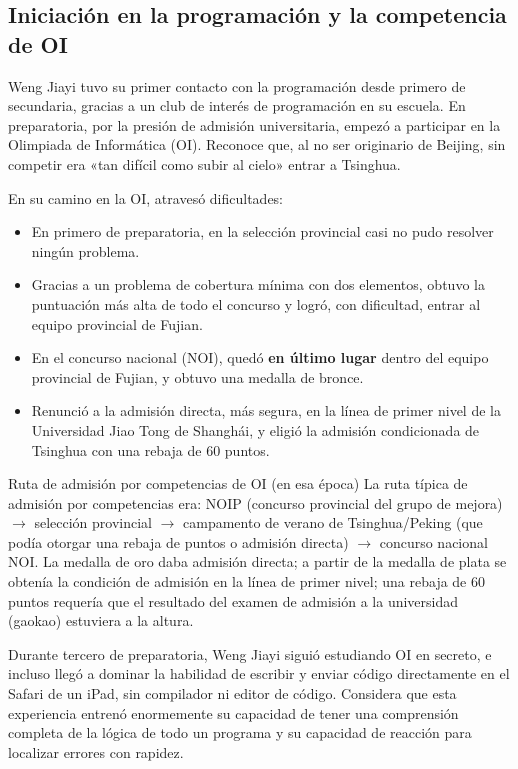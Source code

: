 \subsection{Iniciación en la programación y la competencia de OI}

Weng Jiayi tuvo su primer contacto con la programación desde primero de secundaria, gracias a un club de interés de programación en su escuela. En preparatoria, por la presión de admisión universitaria, empezó a participar en la Olimpiada de Informática (OI). Reconoce que, al no ser originario de Beijing, sin competir era «tan difícil como subir al cielo» entrar a Tsinghua.

En su camino en la OI, atravesó dificultades:
\begin{itemize}
    \item En primero de preparatoria, en la selección provincial casi no pudo resolver ningún problema.
    \item Gracias a un problema de cobertura mínima con dos elementos, obtuvo la puntuación más alta de todo el concurso y logró, con dificultad, entrar al equipo provincial de Fujian.
    \item En el concurso nacional (NOI), quedó \textbf{en último lugar} dentro del equipo provincial de Fujian, y obtuvo una medalla de bronce.
    \item Renunció a la admisión directa, más segura, en la línea de primer nivel de la Universidad Jiao Tong de Shanghái, y eligió la admisión condicionada de Tsinghua con una rebaja de 60 puntos.
\end{itemize}

\begin{knowledgebox}{Ruta de admisión por competencias de OI (en esa época)}
La ruta típica de admisión por competencias era: NOIP (concurso provincial del grupo de mejora) $\rightarrow$ selección provincial $\rightarrow$ campamento de verano de Tsinghua/Peking (que podía otorgar una rebaja de puntos o admisión directa) $\rightarrow$ concurso nacional NOI. La medalla de oro daba admisión directa; a partir de la medalla de plata se obtenía la condición de admisión en la línea de primer nivel; una rebaja de 60 puntos requería que el resultado del examen de admisión a la universidad (gaokao) estuviera a la altura.
\end{knowledgebox}

Durante tercero de preparatoria, Weng Jiayi siguió estudiando OI en secreto, e incluso llegó a dominar la habilidad de escribir y enviar código directamente en el Safari de un iPad, sin compilador ni editor de código. Considera que esta experiencia entrenó enormemente su capacidad de tener una comprensión completa de la lógica de todo un programa y su capacidad de reacción para localizar errores con rapidez.


